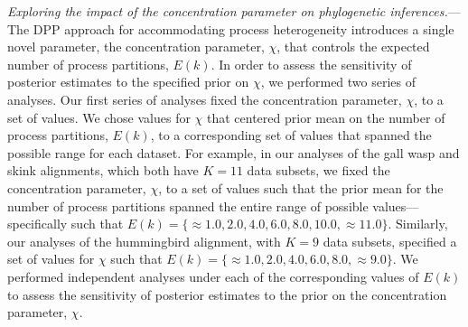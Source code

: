 \documentclass[11pt]{article}
\begin{document}

\bigskip
\noindent
{\it Exploring the impact of the concentration parameter on phylogenetic inferences.}---The DPP approach for accommodating process heterogeneity introduces a single novel parameter, the concentration parameter, $\chi$, that controls the expected number of process partitions, $E(k)$.
In order to assess the sensitivity of posterior estimates to the specified prior on $\chi$, we performed two series of analyses.
Our first series of analyses fixed the concentration parameter, $\chi$, to a set of values.
We chose values for $\chi$ that centered prior mean on the number of process partitions, $E(k)$, to a corresponding set of values that spanned the possible range for each dataset.  
For example, in our analyses of the gall wasp and skink alignments, which both have $K = 11$ data subsets, we fixed the concentration parameter, $\chi$, to a set of values such that the prior mean for the number of process partitions spanned the entire range of possible values---specifically such that $E(k) = \{\approx 1.0, 2.0, 4.0, 6.0, 8.0, 10.0, \approx 11.0\}$.
Similarly, our analyses of the hummingbird alignment, with $K = 9$ data subsets, specified a set of values for $\chi$ such that $E(k) =\{\approx 1.0, 2.0, 4.0, 6.0, 8.0, \approx 9.0\}$.
We performed independent analyses under each of the corresponding values of $E(k)$ to assess the sensitivity of posterior estimates to the prior on the concentration parameter, $\chi$.
\end{document}
